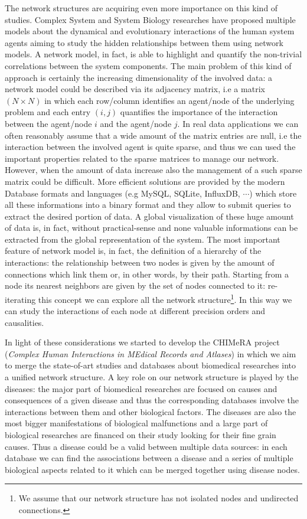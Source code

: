 \documentclass{standalone}
\begin{document}
The network structures are acquiring even more importance on this kind of studies.
Complex System and System Biology researches have proposed multiple models about the dynamical and evolutionary interactions of the human system agents aiming to study the hidden relationships between them using network models.
A network model, in fact, is able to highlight and quantify the non-trivial correlations between the system components.
The main problem of this kind of approach is certainly the increasing dimensionality of the involved data: a network model could be described via its adjacency matrix, i.e a matrix $(N\times N)$ in which each row/column identifies an agent/node of the underlying problem and each entry $(i, j)$ quantifies the importance of the interaction between the agent/node $i$ and the agent/node $j$.
In real data applications we can often reasonably assume that a wide amount of the matrix entries are null, i.e the interaction between the involved agent is quite sparse, and thus we can used the important properties related to the sparse matrices to manage our network.
However, when the amount of data increase also the management of a such sparse matrix could be difficult.
More efficient solutions are provided by the modern Database formats and languages (e.g \textsf{MySQL}, \textsf{SQLite}, \textsf{InfluxDB}, $\cdots$) which store all these informations into a binary format and they allow to submit queries to extract the desired portion of data.
A global visualization of these huge amount of data is, in fact, without practical-sense and none valuable informations can be extracted from the global representation of the system.
The most important feature of network model is, in fact, the definition of a hierarchy of the interactions: the relationship between two nodes is given by the amount of connections which link them or, in other words, by their path.
Starting from a node its nearest neighbors are given by the set of nodes connected to it: re-iterating this concept we can explore all the network structure\footnote{
  We assume that our network structure has not isolated nodes and undirected connections.
}.
In this way we can study the interactions of each node at different precision orders and causalities.

In light of these considerations we started to develop the \textsf{CHIMeRA} project (\emph{Complex Human Interactions in MEdical Records and Atlases}) in which we aim to merge the state-of-art studies and databases about biomedical researches into a unified network structure.
A key role on our network structure is played by the diseases: the major part of biomedical researches are focused on causes and consequences of a given disease and thus the corresponding databases involve the interactions between them and other biological factors.
The diseases are also the most bigger manifestations of biological malfunctions and a large part of biological researches are financed on their study looking for their fine grain causes.
Thus a disease could be a valid  between multiple data sources: in each database we can find the associations between a disease and a series of multiple biological aspects related to it which can be merged together using disease nodes.
\end{document}
